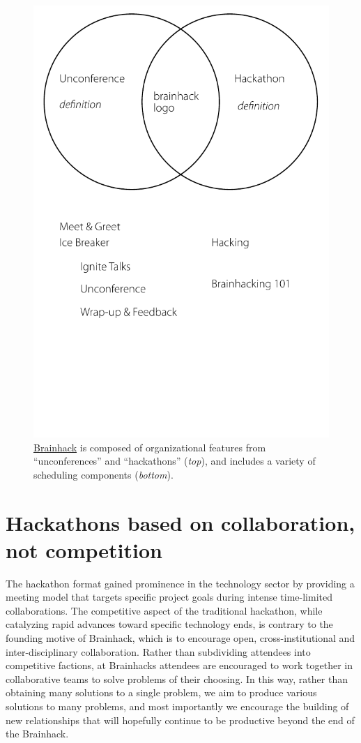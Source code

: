 \documentclass[11pt]{bmc_article_s50}
\begin{document}
\begin{figure}[ht!]
\begin{center}
  \includegraphics[width=.5\textwidth]{Figure_01}
  \caption{\href{http://www.brainhack.org}{Brainhack} is composed of organizational features from ``unconferences'' and ``hackathons'' (\emph{top}), and includes a variety of scheduling components (\emph{bottom}).}
\end{center}
\end{figure}

\section{Hackathons based on collaboration, not competition}\label{hackathons-based-on-collaboration-not-competition}

The hackathon format gained prominence in the technology sector by providing a meeting model that targets specific project goals during intense time-limited collaborations. The competitive aspect of the traditional hackathon, while catalyzing rapid advances toward specific technology ends, is contrary to the founding motive of Brainhack, which is to encourage open, cross-institutional and inter-disciplinary collaboration. Rather than subdividing attendees into competitive factions, at Brainhacks attendees are encouraged to work together in collaborative teams to solve problems of their choosing. In this way,  rather than obtaining many solutions to a single problem, we aim to produce various solutions to many problems,  and most importantly we encourage the building of new relationships that will hopefully continue to be productive beyond the end of the Brainhack.
\end{document}
